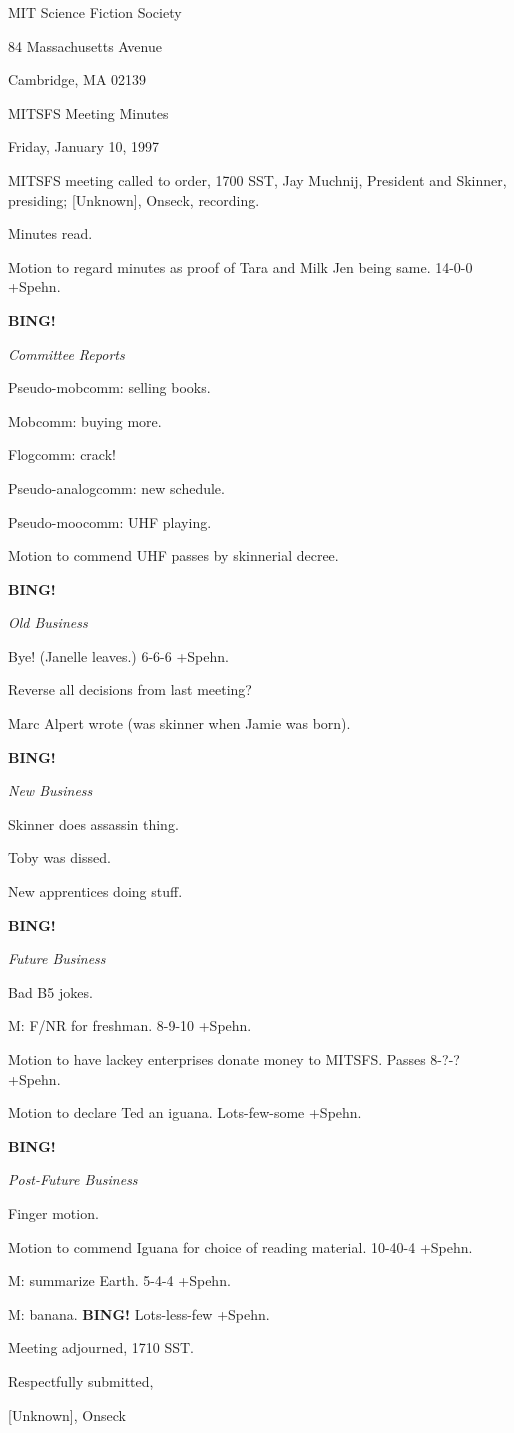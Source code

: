 \documentclass[12pt]{article}
\newcommand{\bing}{{\bf BING!} }
\newcommand{\goto}[1]{\bing \vskip 12pt \centerline{{\em{#1}}}}
\begin{document}
\begin{center}

MIT Science Fiction Society 

84 Massachusetts Avenue

Cambridge, MA 02139

\vspace{12pt}

MITSFS Meeting Minutes 

Friday, January 10, 1997

\end{center}
 
\vspace{18pt}

\setlength{\parskip}{6pt}

\noindent
MITSFS meeting called to order, 1700 SST,
Jay Muchnij, President and Skinner, presiding; [Unknown], Onseck, recording.

Minutes read.

Motion to regard minutes as proof of Tara and Milk Jen being same. 14-0-0 +Spehn.

\goto{Committee Reports}

Pseudo-mobcomm: selling books.

Mobcomm: buying more.

Flogcomm: crack!

Pseudo-analogcomm: new schedule.

Pseudo-moocomm: UHF playing.

Motion to commend UHF passes by skinnerial decree.

\goto{Old Business}

Bye! (Janelle leaves.) 6-6-6 +Spehn.

Reverse all decisions from last meeting?

Marc Alpert wrote (was skinner when Jamie was born).

\goto{New Business}

Skinner does assassin thing.

Toby was dissed.

New apprentices doing stuff.

\goto{Future Business}

Bad B5 jokes.

M: F/NR for freshman. 8-9-10 +Spehn.

Motion to have lackey enterprises donate money to MITSFS. Passes 8-?-? +Spehn.

Motion to declare Ted an iguana. Lots-few-some +Spehn.

\goto{Post-Future Business}

Finger motion.

Motion to commend Iguana for choice of reading material. 10-40-4 +Spehn.

M: summarize Earth. 5-4-4 +Spehn.

M: banana. \bing Lots-less-few +Spehn.

\vspace{12pt}

\noindent
Meeting adjourned, 1710 SST.

\vspace{18pt}

\centerline{Respectfully submitted,}
\centerline{[Unknown], Onseck}
\end{document}
